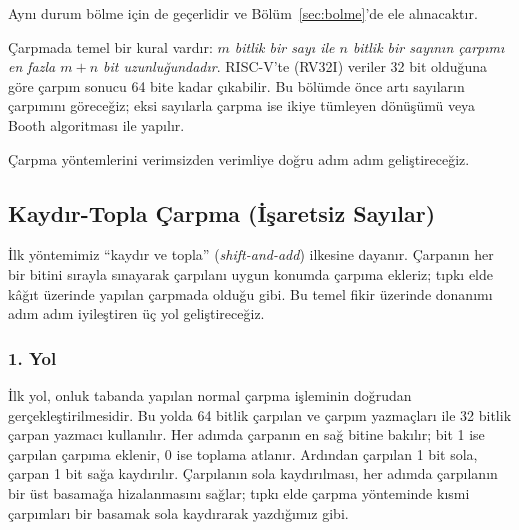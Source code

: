 Aynı durum bölme için de geçerlidir ve Bölüm~\ref{sec:bolme}'de ele alınacaktır.

Çarpmada temel bir kural vardır: \emph{$m$ bitlik bir sayı ile $n$ bitlik bir sayının çarpımı en fazla $m+n$ bit uzunluğundadır}. RISC-V'te (RV32I) veriler 32 bit olduğuna göre çarpım sonucu 64 bite kadar çıkabilir. Bu bölümde önce artı sayıların çarpımını göreceğiz; eksi sayılarla çarpma ise ikiye tümleyen dönüşümü veya Booth algoritması ile yapılır.

Çarpma yöntemlerini verimsizden verimliye doğru adım adım geliştireceğiz.

\subsection{Kaydır-Topla Çarpma (İşaretsiz Sayılar)}
\label{sec:kaydir-topla-carpma}

İlk yöntemimiz ``kaydır ve topla'' (\emph{shift-and-add}) ilkesine dayanır. Çarpanın her bir bitini sırayla sınayarak çarpılanı uygun konumda çarpıma ekleriz; tıpkı elde kâğıt üzerinde yapılan çarpmada olduğu gibi. Bu temel fikir üzerinde donanımı adım adım iyileştiren üç yol geliştireceğiz.

\subsubsection{1. Yol}

İlk yol, onluk tabanda yapılan normal çarpma işleminin doğrudan gerçekleştirilmesidir. Bu yolda 64 bitlik çarpılan ve çarpım yazmaçları ile 32 bitlik çarpan yazmacı kullanılır. Her adımda çarpanın en sağ bitine bakılır; bit 1 ise çarpılan çarpıma eklenir, 0 ise toplama atlanır. Ardından çarpılan 1 bit sola, çarpan 1 bit sağa kaydırılır. Çarpılanın sola kaydırılması, her adımda çarpılanın bir üst basamağa hizalanmasını sağlar; tıpkı elde çarpma yönteminde kısmi çarpımları bir basamak sola kaydırarak yazdığımız gibi.

